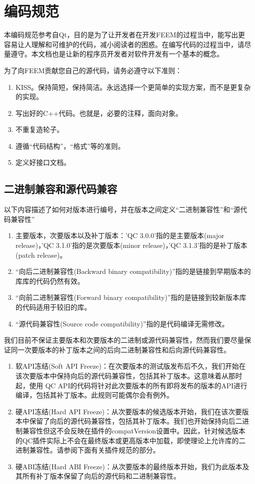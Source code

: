 \chapter{编码规范}
本编码规范参考自Qt，目的是为了让开发者在开发FEEM的过程当中，能写出更容易让人理解和可维护的代码，减小阅读者的困惑。在编写代码的过程当中，请尽量遵守。本文档也是让新的程序员开发者对软件开发有一个基本的概念。

为了向FEEM贡献您自己的源代码，请务必遵守以下准则：

\begin{enumerate}
	\item KISS。保持简短，保持简洁。永远选择一个更简单的实现方案，而不是更复杂的实现。
	\item 写出好的C++代码。也就是，必要的注释，面向对象。
	\item 不重复造轮子。
	\item 遵循“代码结构”，“格式”等的准则。
	\item 定义好接口文档。
\end{enumerate}


\section{二进制兼容和源代码兼容}
以下内容描述了如何对版本进行编号，并在版本之间定义“二进制兼容性”和“源代码兼容性”

\begin{enumerate}
	\item 主要版本，次要版本以及补丁版本：'QC 3.0.0'指的是主要版本(major release)，'QC 3.1.0'指的是次要版本(minor release)，'QC 3.1.3'指的是补丁版本(patch release)。
	\item “向后二进制兼容性(Backward binary compatibility)”指的是链接到早期版本的库库的代码仍然有效。
	\item “向前二进制兼容性(Forward binary compatibility)”指的是链接到较新版本库的代码适用于较旧的库。
	\item “源代码兼容性(Source code compatibility)”指的是代码编译无需修改。
\end{enumerate}

我们目前不保证主要版本和次要版本的二进制或源代码兼容性，然而我们要尽量保证同一次要版本的补丁版本之间的后向二进制兼容性和后向源代码兼容性。

\begin{enumerate}
	\item 软API冻结(Soft API Freeze)：在次要版本的测试版发布后不久，我们开始在该次要版本中保持向后的源代码兼容性，包括其补丁版本。这意味着从那时起，使用 QC API的代码将针对此次要版本的所有即将发布的版本的API进行编译，包括其补丁版本。此规则可能偶尔会有例外。
	\item 硬API冻结(Hard API Freeze)：从次要版本的候选版本开始，我们在该次要版本中保留了向后的源代码兼容性，包括其补丁版本。我们也开始保持向后二进制兼容性但这不会反映在插件的compatVersion设置中。因此，针对候选版本的QC插件实际上不会在最终版本或更高版本中加载，即使理论上允许库的二进制兼容性。请参阅下面有关插件规范的部分。
	\item 硬ABI冻结(Hard ABI Freeze)：从次要版本的最终版本开始，我们为此版本及其所有补丁版本保留了向后的源代码和二进制兼容性。
\end{enumerate}

